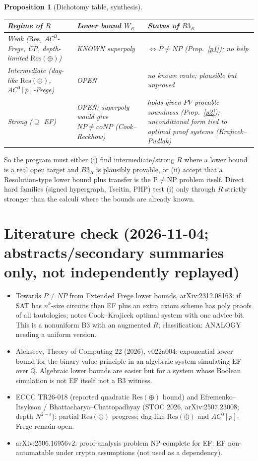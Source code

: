 \documentclass[11pt]{article}
\newtheorem{proposition}{Proposition}
\theoremstyle{remark}
\newcommand{\Wb}{\overline W}
\begin{document}
\begin{proposition}[Dichotomy table, synthesis]
\begin{center}\begin{tabular}{p{3.3cm}p{4.2cm}p{5.5cm}}
Regime of $R$ & Lower bound $\Wb_R$ & Status of $B3_R$\\\hline
Weak ($\mathrm{Res}$, $AC^0$-Frege, CP, depth-limited $\mathrm{Res}(\oplus)$) & KNOWN superpoly & $\iff P\neq NP$ (Prop.~\ref{p1}); no help\\
Intermediate (dag-like $\mathrm{Res}(\oplus)$, $AC^0[p]$-Frege) & OPEN & no known route; plausible but unproved\\
Strong ($\supseteq$ EF) & OPEN; superpoly would give $NP\ne coNP$ (Cook--Reckhow) & holds given $PV$-provable soundness (Prop.~\ref{p2}); unconditional form tied to optimal proof systems (Krajicek--Pudlak)
\end{tabular}\end{center}
\end{proposition}
\noindent So the program must either (i) find intermediate/strong $R$ where a lower bound is a real open target and $B3_R$ is plausibly provable, or (ii) accept that a Resolution-type lower bound plus transfer is the P$\neq$NP problem itself. Direct hard families (signed hypergraph, Tseitin, PHP) test (i) only through $R$ strictly stronger than the calculi where the bounds are already known.

\section*{Literature check (2026-11-04; abstracts/secondary summaries only, not independently replayed)}
\begin{itemize}
\item Towards $P\neq NP$ from Extended Frege lower bounds, arXiv:2312.08163: if SAT has $n^k$-size circuits then EF plus an extra axiom scheme has poly proofs of all tautologies; notes Cook--Krajicek optimal system with one advice bit. This is a nonuniform B3 with an augmented $R$; classification: ANALOGY needing a uniform version.
\item Alekseev, Theory of Computing 22 (2026), v022a004: exponential lower bound for the binary value principle in an algebraic system simulating EF over $\mathbb Q$. Algebraic lower bounds are easier but for a system whose Boolean simulation is not EF itself; not a B3 witness.
\item ECCC TR26-018 (reported quadratic $\mathrm{Res}(\oplus)$ bound) and Efremenko--Itsykson / Bhattacharya--Chattopadhyay (STOC 2026, arXiv:2507.23008; depth $N^{2-\epsilon}$): partial $\mathrm{Res}(\oplus)$ progress; dag-like $\mathrm{Res}(\oplus)$ and $AC^0[p]$-Frege remain open.
\item arXiv:2506.16956v2: proof-analysis problem NP-complete for EF; EF non-automatable under crypto assumptions (not used as a dependency).
\end{itemize}
\end{document}
